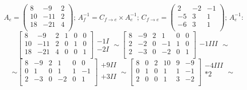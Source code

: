 \documentclass[12pt]{article}
\begin{document}
$$
	A_e =
	\begin{pmatrix}
		8  & -9  & 2 \\
		10 & -11 & 2 \\
		18 & -21 & 4 \\
	\end{pmatrix}\text{; }
	A_f^{-1} = C_{f \rightarrow e} \times A_e^{-1}\text{; }
	C_{f \rightarrow e} =
	\begin{pmatrix}
		2  & -2 & -1 \\
		-5 & 3  & 1  \\
		-6 & 3  & 1  \\
	\end{pmatrix}\text{; }
	A_e^{-1}\text{:}
$$
$$
	\left[
		\begin{array}{ccc|ccc}
			8  & -9  & 2 & 1 & 0 & 0 \\
			10 & -11 & 2 & 0 & 1 & 0 \\
			18 & -21 & 4 & 0 & 0 & 1 \\
		\end{array}
		\right]
	\begin{matrix} \\ -1I \\ -2I \\ \end{matrix} \sim
	\left[
		\begin{array}{ccc|ccc}
			8 & -9 & 2 & 1  & 0 & 0 \\
			2 & -2 & 0 & -1 & 1 & 0 \\
			2 & -3 & 0 & -2 & 0 & 1 \\
		\end{array}
		\right]
	\begin{matrix} \\ -1III\\ \\ \end{matrix} \sim
$$
$$
	\sim
	\left[
		\begin{array}{ccc|ccc}
			8 & -9 & 2 & 1  & 0 & 0  \\
			0 & 1  & 0 & 1  & 1 & -1 \\
			2 & -3 & 0 & -2 & 0 & 1  \\
		\end{array}
		\right]
	\begin{matrix} +9II \\ \\ +3II \\ \end{matrix} \sim
	\left[
		\begin{array}{ccc|ccc}
			8 & 0 & 2 & 10 & 9 & -9 \\
			0 & 1 & 0 & 1  & 1 & -1 \\
			2 & 0 & 0 & 1  & 3 & -2 \\
		\end{array}
		\right]
	\begin{matrix} -4III \\ *2 \\ \\ \end{matrix} \sim
$$
\end{document}

